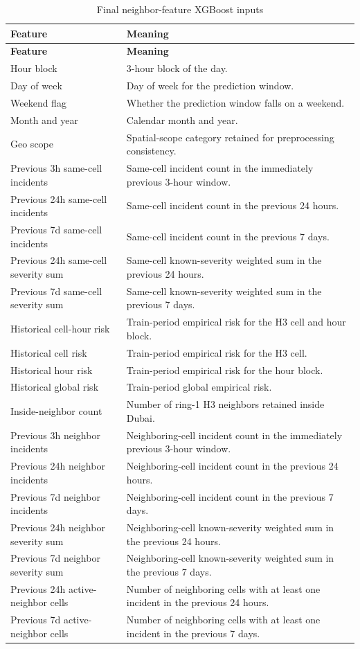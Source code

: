 \scriptsize
\begin{longtable}{L{0.34\textwidth}L{0.56\textwidth}}
\caption{Final neighbor-feature XGBoost inputs}
\label{tab:appendix_final_features}\\
\toprule
\textbf{Feature} & \textbf{Meaning} \\
\midrule
\endfirsthead
\toprule
\textbf{Feature} & \textbf{Meaning} \\
\midrule
\endhead
Hour block & 3-hour block of the day. \\
Day of week & Day of week for the prediction window. \\
Weekend flag & Whether the prediction window falls on a weekend. \\
Month and year & Calendar month and year. \\
Geo scope & Spatial-scope category retained for preprocessing consistency. \\
Previous 3h same-cell incidents & Same-cell incident count in the immediately previous 3-hour window. \\
Previous 24h same-cell incidents & Same-cell incident count in the previous 24 hours. \\
Previous 7d same-cell incidents & Same-cell incident count in the previous 7 days. \\
Previous 24h same-cell severity sum & Same-cell known-severity weighted sum in the previous 24 hours. \\
Previous 7d same-cell severity sum & Same-cell known-severity weighted sum in the previous 7 days. \\
Historical cell-hour risk & Train-period empirical risk for the H3 cell and hour block. \\
Historical cell risk & Train-period empirical risk for the H3 cell. \\
Historical hour risk & Train-period empirical risk for the hour block. \\
Historical global risk & Train-period global empirical risk. \\
Inside-neighbor count & Number of ring-1 H3 neighbors retained inside Dubai. \\
Previous 3h neighbor incidents & Neighboring-cell incident count in the immediately previous 3-hour window. \\
Previous 24h neighbor incidents & Neighboring-cell incident count in the previous 24 hours. \\
Previous 7d neighbor incidents & Neighboring-cell incident count in the previous 7 days. \\
Previous 24h neighbor severity sum & Neighboring-cell known-severity weighted sum in the previous 24 hours. \\
Previous 7d neighbor severity sum & Neighboring-cell known-severity weighted sum in the previous 7 days. \\
Previous 24h active-neighbor cells & Number of neighboring cells with at least one incident in the previous 24 hours. \\
Previous 7d active-neighbor cells & Number of neighboring cells with at least one incident in the previous 7 days. \\
\bottomrule
\end{longtable}
\normalsize

